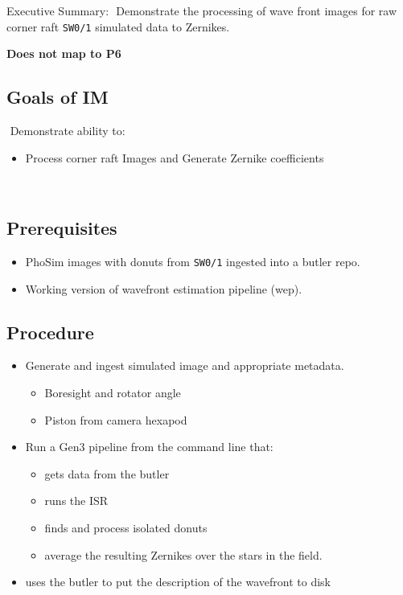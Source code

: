 
Executive Summary:
​
Demonstrate the processing of wave front images for raw corner raft \texttt{SW0/1} simulated data
to Zernikes.

\textbf{Does not map to P6}
​
\subsection{Goals of IM}
​
Demonstrate ability to:
​
\begin{itemize}
\item Process corner raft Images and Generate Zernike coefficients
\end{itemize}
​
\subsection{Prerequisites}
\begin{itemize}
\item PhoSim images with donuts from \texttt{SW0/1} ingested into a butler repo.
\item Working version of wavefront estimation pipeline (wep). 
\end{itemize}

\subsection{Procedure}
\begin{itemize}
\item Generate and ingest simulated image and appropriate metadata.
  \begin{itemize}
  \item Boresight and rotator angle
  \item Piston from camera hexapod
  \end{itemize}
\item Run a Gen3 pipeline from the command line that:
  \begin{itemize}
  \item gets data from the butler
  \item runs the ISR
  \item finds and process isolated donuts
  \item average the resulting Zernikes over the stars in the field.
  \end{itemize}
  \item uses the butler to put the description of the wavefront to disk
\end{itemize}


